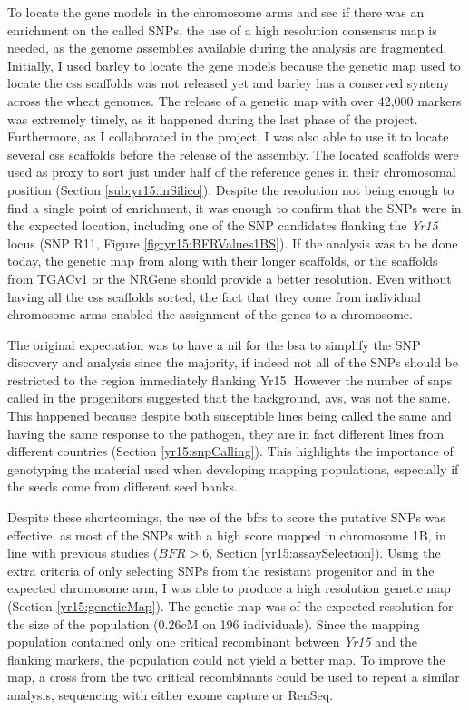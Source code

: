 To locate the gene models in the chromosome arms and see if there was an enrichment on the called SNPs, the use of a high resolution consensus map is needed, as the genome assemblies available during the analysis are fragmented. 
Initially, I used barley to locate the gene models because the genetic map used to locate the \gls{css} scaffolds was not released yet and barley has a conserved synteny across the wheat genomes. 
The release of a genetic map with over 42,000 markers \citep{Wang2014} was extremely timely, as it happened during the last phase of the project.
Furthermore, as I collaborated in the project, I was also able to use it to locate several \acrshort{css} scaffolds before the release of the assembly. 
The located scaffolds were used as proxy to sort just under half of the reference genes in their chromosomal position (Section \ref{sub:yr15:inSilico}). 
Despite the resolution not being enough to find a single point of enrichment, it was enough to confirm that the SNPs were in the expected location, including one of the SNP candidates flanking the \textit{Yr15} locus (SNP R11, Figure \ref{fig:yr15:BFRValues1BS}).  
If the analysis was to be done today, the genetic map from \citet{Chapman2015} along with their longer scaffolds, or the scaffolds from TGACv1 or the NRGene should provide a better resolution. 
Even without having all the \acrshort{css} scaffolds sorted, the fact that they come from individual chromosome arms enabled the assignment of the genes to a chromosome. 

The original expectation was to have a \gls{nil} for the \gls{bsa} to simplify the SNP discovery and analysis since the majority, if indeed not all of the SNPs should be restricted to the region immediately flanking Yr15. However the number of \glspl{snp} called in the progenitors suggested that the background, \acrlong{avs}, was not the same.  
This happened because despite both susceptible lines being called the same and having the same response to the pathogen, they are in fact different lines from different countries (Section \ref{yr15:snpCalling}). 
This highlights the importance of genotyping the material used when developing mapping populations, especially if the seeds come from different seed banks. 

Despite these shortcomings, the use of the \glspl{bfr} to score the putative SNPs was effective, as most of the SNPs with a high score  mapped in chromosome 1B, in line with previous studies ($BFR>6$, Section \ref{yr15:assaySelection}).
Using the extra criteria of only selecting SNPs from the resistant progenitor and in the expected chromosome arm, I was able to produce a high resolution genetic map (Section \ref{yr15:geneticMap}). 
The genetic map was of the expected resolution for the size of the population (0.26cM on 196 individuals).
Since the mapping population contained only one critical recombinant between \textit{Yr15} and the flanking markers, the population could not yield a better map. 
To improve the map, a cross from the two critical recombinants could be used to repeat a similar analysis, sequencing with either exome capture or RenSeq. 

